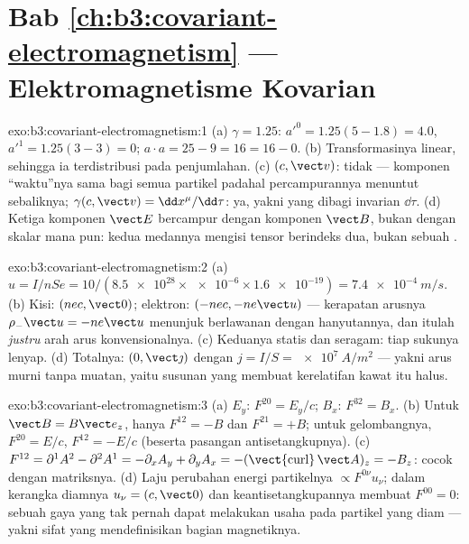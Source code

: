 \section*{Bab \ref{ch:b3:covariant-electromagnetism} --- Elektromagnetisme Kovarian}

\begin{solution}{exo:b3:covariant-electromagnetism:1}
(a) $\gamma = 1.25$: $a'^0 = 1.25(5 - 1.8) = 4.0$, $a'^1 = 1.25(3 -
3) = 0$; $a\cdot a = 25 - 9 = 16 = 16 - 0$. (b) Transformasinya
linear, sehingga ia terdistribusi pada penjumlahan. (c) $(c, \vect v)$: tidak ---
komponen ``waktu''nya sama bagi semua partikel padahal percampurannya
menuntut sebaliknya; $\gamma(c, \vect v) = \dd x^\mu/\dd\tau$: ya, yakni
 yang dibagi invarian $\dd\tau$. (d) Ketiga komponen $\vect E$
bercampur dengan komponen $\vect B$, bukan dengan skalar mana pun: kedua
medannya mengisi tensor berindeks dua, bukan sebuah .
\end{solution}

\begin{solution}{exo:b3:covariant-electromagnetism:2}
(a) $u = I/nSe = 10/(\num{8.5e28} \times \num{e-6} \times
\num{1.6e-19}) = \qty{7.4e-4}{m/s}$. (b) Kisi: $(nec, \vect 0)$;
elektron: $(-nec, -ne\vect u)$ --- kerapatan arusnya
$\rho_-\vect u = -ne\vect u$ menunjuk berlawanan dengan hanyutannya, dan
itulah \emph{justru} arah arus konvensionalnya. (c) Keduanya statis dan seragam: tiap sukunya lenyap. (d)
Totalnya: $(0, \vect\jmath)$ dengan $j = I/S = \qty{e7}{A/m^2}$ --- yakni
arus murni tanpa muatan, yaitu susunan yang membuat kerelatifan kawat itu
halus.
\end{solution}

\begin{solution}{exo:b3:covariant-electromagnetism:3}
(a) $E_y$: $F^{20} = E_y/c$; $B_x$: $F^{32} = B_x$. (b) Untuk $\vect B
= B\vect e_z$, hanya $F^{12} = -B$ dan $F^{21} = +B$; untuk gelombangnya,
$F^{20} = E/c$, $F^{12} = -E/c$ (beserta pasangan antisetangkupnya). (c)
$F^{12} = \partial^1A^2 - \partial^2A^1 = -\partial_xA_y +
\partial_yA_x = -(\operatorname{\vect{curl}}\vect A)_z = -B_z$: cocok
dengan matriksnya. (d) Laju perubahan energi partikelnya
$\propto F^{0\nu}u_\nu$; dalam kerangka diamnya $u_\nu = (c, \vect 0)$ dan
keantisetangkupannya membuat $F^{00} = 0$: sebuah gaya yang tak pernah
dapat melakukan usaha pada partikel yang diam --- yakni sifat yang
mendefinisikan bagian magnetiknya.
\end{solution}

